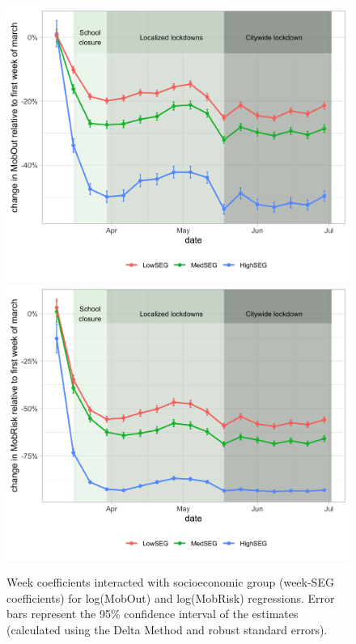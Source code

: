 \begin{figure}[hbt]
    \centering
    \includegraphics[width=.49\textwidth]{imagenes/figs_tabs_pandemic/LockdownOnMobility/PNASFig3_v4_LogFracOut_vcovHC_white1_HC1.png}
    \includegraphics[width=.49\textwidth]{imagenes/figs_tabs_pandemic/LockdownOnMobility/PNASFig3_v4_LogMobRisk_vcovHC_white1_HC1.png}
    \caption{Week coefficients  interacted with socioeconomic group (week-SEG coefficients) for log(MobOut) and log(MobRisk) regressions. Error bars represent the 95\% confidence interval of the estimates (calculated using the Delta Method and robust standard errors).}
    \label{fig:weekEstrato.modelFullInteraction}
\end{figure}

%     

%     

